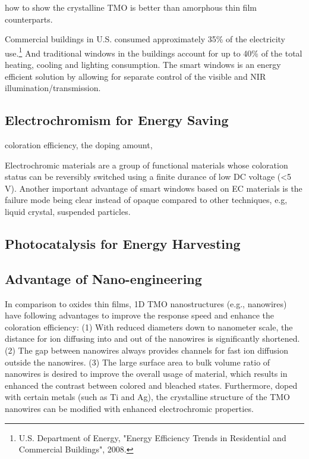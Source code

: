 how to show the crystalline TMO is better than amorphous thin film counterparts.

Commercial buildings in U.S. consumed approximately 35\% of the electricity use.\footnote{U.S. Department of Energy, "Energy Efficiency Trends in Residential and Commercial Buildings", 2008.} And traditional windows in the buildings account for up to 40\% of the total heating, cooling and lighting consumption. The smart windows is an energy efficient solution by allowing for separate control of the visible and NIR illumination/transmission.  

\subsection{Electrochromism for Energy Saving}

coloration efficiency, the doping amount, 

Electrochromic materials are a group of functional materials whose coloration status  can be reversibly switched using a finite durance of low DC voltage (\textless 5 V). Another important advantage of smart windows based on EC materials is the failure mode being clear instead of opaque compared to other techniques, e.g, liquid crystal, suspended particles. 

\subsection{Photocatalysis for Energy Harvesting}



\subsection{Advantage of Nano-engineering}

In comparison to oxides thin films, 1D TMO nanostructures (e.g., nanowires) have following advantages to improve the response speed and enhance the coloration efficiency: (1) With reduced diameters down to nanometer scale, the distance for ion diffusing into and out of the nanowires is significantly shortened. (2) The gap between nanowires always provides channels for fast ion diffusion outside the nanowires. (3) The large surface area to bulk volume ratio of nanowires is desired to improve the overall usage of material, which results in enhanced the contrast between colored and bleached states. Furthermore, doped with certain metals (such as Ti and Ag), the crystalline structure of the TMO nanowires can be modified with enhanced electrochromic properties.\cite{Xiong2008} 



